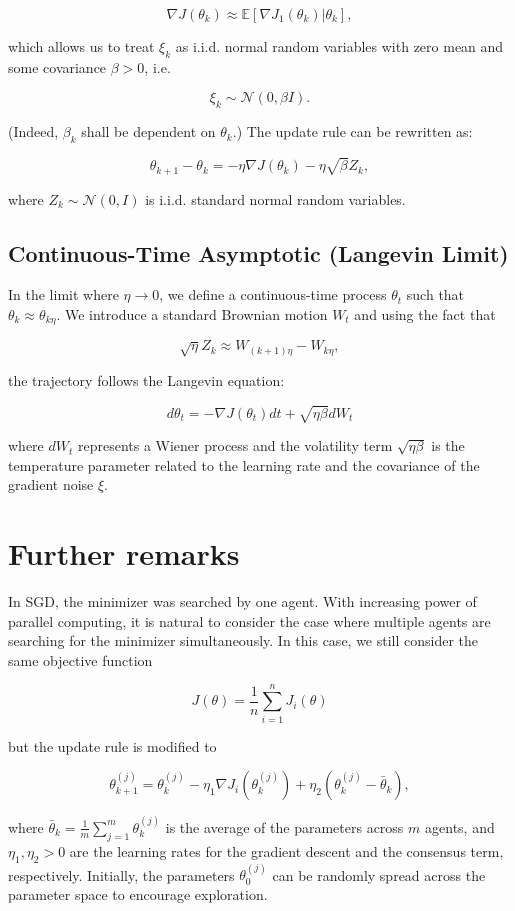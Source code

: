 \documentclass[11pt]{article}
\begin{document}
$$ \nabla J(\theta_k) \approx \mathbb E [\nabla J_1(\theta_k) | \theta_k], $$

which allows us to treat $\xi_k$ as i.i.d. 
normal random variables with zero mean and some covariance 
$\beta>0$, i.e. 

$$\xi_k \sim \mathcal{N}(0, \beta I).$$

(Indeed, $\beta_k$ shall be dependent on $\theta_k$.) 
The update rule can be rewritten as:

$$
\theta_{k+1} - \theta_k = - \eta \nabla J(\theta_k) - \eta \sqrt{\beta} Z_k,$$

where $Z_k \sim \mathcal{N}(0, I)$ is i.i.d. standard normal random variables.


\subsection{Continuous-Time Asymptotic (Langevin Limit)}

In the limit where $\eta \to 0$, we define a continuous-time process $\theta_t$ such that $\theta_k \approx \theta_{k\eta}$. 
We introduce a standard Brownian motion $W_t$ and using the fact that 

$$\sqrt{\eta} Z_k \approx W_{(k+1)\eta} - W_{k\eta},$$


the trajectory follows the Langevin equation:

$$
d\theta_t = -\nabla J(\theta_t) dt + \sqrt{\eta \beta} dW_t
$$

where $dW_t$ represents a Wiener process and the volatility term $\sqrt{\eta \beta}$ 
is the temperature parameter related to the learning rate and the covariance of the gradient noise $\xi$.

\section{Further remarks}
In SGD, the minimizer was searched by one agent. 
With increasing power of parallel computing, it is natural to consider the case where multiple agents are searching for the minimizer simultaneously.
In this case, we still consider the same objective function

$$J(\theta) = \frac{1}{n} \sum_{i=1}^{n} J_i(\theta)$$

but the update rule is modified to

$$\theta_{k+1}^{(j)} = \theta_k^{(j)} - \eta_1 \nabla J_{i}(\theta_k^{(j)}) + \eta_2 (\theta_k^{(j)} - \bar \theta_k),$$

where $\bar \theta_k = \frac{1}{m} \sum_{j=1}^{m} \theta_k^{(j)}$ is the average of the parameters across $m$ agents, 
and $\eta_1, \eta_2>0$ are the learning rates for the gradient descent and the consensus term, respectively.
Initially, the parameters $\theta_0^{(j)}$ can be randomly spread across the parameter space to encourage exploration.
\end{document}
